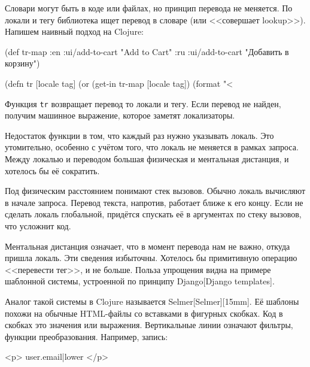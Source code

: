 Словари могут быть в коде или файлах, но принцип перевода не меняется. По локали
и тегу библиотека ищет перевод в словаре (или <<совершает lookup>>). Напишем
наивный подход на Clojure:

  \begin{clojure}
(def tr-map
  {:en {:ui/add-to-cart "Add to Cart"}
   :ru {:ui/add-to-cart "Добавить в корзину"}})

(defn tr [locale tag]
  (or (get-in tr-map [locale tag])
      (format "<%
  \end{clojure}


Функция \verb|tr| возвращает перевод то локали и тегу. Если перевод не найден,
получим машинное выражение, которое заметят локализаторы.

Недостаток функции в том, что каждый раз нужно указывать локаль. Это
утомительно, особенно с учётом того, что локаль не меняется в рамках
запроса. Между локалью и переводом большая физическая и ментальная
дистанция, и хотелось бы её сократить.


Под физическим расстоянием понимают стек вызовов. Обычно локаль вычисляют в
начале запроса. Перевод текста, напротив, работает ближе к его концу. Если не
сделать локаль глобальной, придётся спускать её в аргументах по стеку вызовов,
что усложнит код.


Ментальная дистанция означает, что в момент перевода нам не важно, откуда пришла
локаль. Эти сведения избыточны. Хотелось бы примитивную операцию <<перевести
тег>>, и не больше. Польза упрощения видна на примере шаблонной системы,
устроенной по принципу Django[Django templates].


Аналог такой системы в Clojure называется
Selmer[Selmer][15mm]. Её шаблоны похожи на
обычные HTML-файлы со вставками в фигурных скобках. Код в скобках это значения
или выражения. Вертикальные линии означают фильтры, функции
преобразования. Например, запись:

\begin{english}
  \begin{htmldjango}
<p>{{ user.email|lower }}</p>
  \end{htmldjango}
\end{english}

